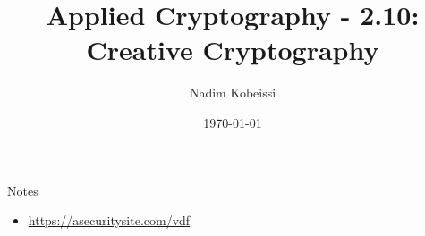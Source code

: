 \documentclass[aspectratio=169, lualatex, handout]{beamer}
\title{Applied Cryptography - 2.10: Creative Cryptography}
\author{Nadim Kobeissi}
\institute{American University of Beirut}
\date{\today}
\begin{document}
\begin{frame}[plain]
	\titlepage
\end{frame}

\incompleteslideswarning

\begin{frame}{Notes}
	\begin{itemize}
		\item \url{https://asecuritysite.com/vdf}
	\end{itemize}
\end{frame}

\incompleteslideswarning

\begin{frame}[plain]
	\titlepage
\end{frame}
\end{document}
